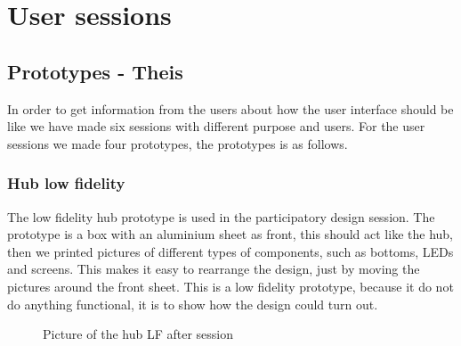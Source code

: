 \chapter{User sessions}
\section{Prototypes - Theis}
In order to get information from the users about how the user interface should be like we have made six sessions with different purpose and users. For the user sessions we made four prototypes, the prototypes is as follows.

\subsection{Hub low fidelity}
The low fidelity hub prototype is used in the participatory design session. The prototype is a box with an aluminium sheet as front, this should act like the hub, then we printed pictures of different types of components, such as bottoms, LEDs and screens. This makes it easy to rearrange the design, just by moving the pictures around the front sheet. This is a low fidelity prototype, because it do not do anything functional, it is to show how the design could turn out.
\begin{figure}[H]
	\center
		\setlength\fboxsep{0pt}
		\setlength\fboxrule{1pt}
   	\caption{Picture of the hub LF after session}
   	\label{fig:LF hub after session}
\end{figure}

